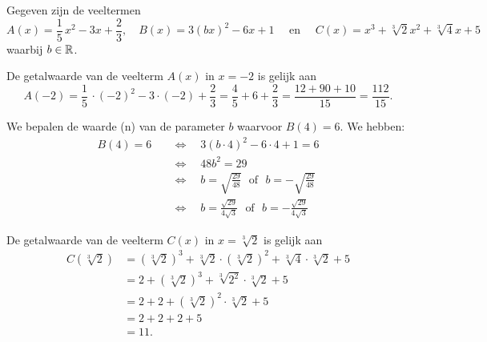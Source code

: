 \documentclass{ximera}
\begin{document}
\begin{example} 
Gegeven zijn de veeltermen
\[
A(x) = \frac{1}{5}\,x^2-3x+\frac{2}{3}, \quad B(x) = 3(bx)^2-6x+1 \quad \text{ en } \quad C(x) = x^3 + \sqrt[3]{2} x^2 + \sqrt[3]{4}x+5
\]
waarbij \(b \in \mathbb{R}\). 


\begin{question}

De getalwaarde van de veelterm \(A(x)\) in \(x = -2\) is gelijk aan
\[
A(-2) = \frac{1}{5}\,\cdot (-2)^2-3\cdot(-2)+\frac{2}{3} = \frac{4}{5} +6+ \frac{2}{3} = \frac{12 + 90 + 10}{15} = \frac{112}{15}.
\]
\end{question}

\begin{question}
We bepalen de waarde (n) van de parameter \(b\) waarvoor \(B(4) = 6\). We hebben:
\begin{align*}
B(4) = 6 \quad 
& \Leftrightarrow \quad 3(b\cdot 4)^2-6\cdot 4+1 = 6 \\ 
& \Leftrightarrow \quad 48b^2 = 29 \\
& \Leftrightarrow \quad b = \sqrt{\frac{29}{48}} \,\,\text{ of }\,\, b = - \sqrt{\frac{29}{48}} \\
& \Leftrightarrow \quad b = \frac{\sqrt{29}}{4\sqrt{3}} \,\,\text{ of }\,\, b = - \frac{\sqrt{29}}{4\sqrt{3}}
\end{align*}
\end{question}

\begin{question}
De getalwaarde van de veelterm \(C(x)\) in \(x = \sqrt[3]{2}\) is gelijk aan
\begin{align*}
C(\sqrt[3]{2}) & = (\sqrt[3]{2})^3 + \sqrt[3]{2}\cdot(\sqrt[3]{2})^2 + \sqrt[3]{4}\cdot \sqrt[3]{2}+5 \\
& = 2 + (\sqrt[3]{2})^3 + \sqrt[3]{2^2}\cdot \sqrt[3]{2} + 5 \\
& = 2 + 2 + (\sqrt[3]{2})^2 \cdot \sqrt[3]{2} + 5 \\
& = 2 + 2 + 2 + 5 \\
& = 11.
\end{align*}
\end{question}
\end{example} 
\end{document}
